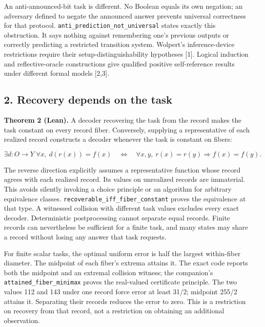 \documentclass[
  10pt,
]{article}
\begin{document}
An anti-announced-bit task is different. No Boolean equals its own negation; an adversary defined to negate the announced answer prevents universal correctness for that protocol. \texttt{anti\_prediction\_not\_universal} states exactly this obstruction. It says nothing against remembering one's previous outputs or correctly predicting a restricted transition system. Wolpert's inference-device restrictions require their setup-distinguishability hypotheses {[}1{]}. Logical induction and reflective-oracle constructions give qualified positive self-reference results under different formal models {[}2,3{]}.

\subsection{2. Recovery depends on the task}\label{recovery-depends-on-the-task}

\textbf{Theorem 2 (Lean).} A decoder recovering the task from the record makes the task constant on every record fiber. Conversely, supplying a representative of each realized record constructs a decoder whenever the task is constant on fibers:

\protect\hypertarget{math-E0004-0004}{}{\[
\exists d:O\to Y\;\forall x,\ d(r(x))=f(x)
\quad\Longleftrightarrow\quad
\forall x,y,\ r(x)=r(y)\Rightarrow f(x)=f(y).
\]}

The reverse direction explicitly assumes a representative function whose record agrees with each realized record. Its values on unrealized records are immaterial. This avoids silently invoking a choice principle or an algorithm for arbitrary equivalence classes. \texttt{recoverable\_iff\_fiber\_constant} proves the equivalence at that type. A witnessed collision with different task values excludes every exact decoder. Deterministic postprocessing cannot separate equal records. Finite records can nevertheless be sufficient for a finite task, and many states may share a record without losing any answer that task requests.

For finite scalar tasks, the optimal uniform error is half the largest within-fiber diameter. The midpoint of each fiber's extrema attains it. The exact code reports both the midpoint and an extremal collision witness; the companion's \texttt{attained\_fiber\_minimax} proves the real-valued certificate principle. The two values 112 and 143 under one record force error at least 31/2; midpoint 255/2 attains it. Separating their records reduces the error to zero. This is a restriction on recovery from that record, not a restriction on obtaining an additional observation.
\end{document}
